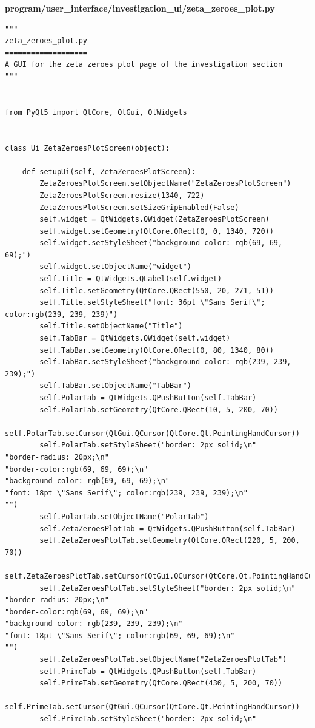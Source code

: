 \documentclass[12pt]{article}
\begin{document}
\textbf{program/user\_interface/investigation\_ui/zeta\_zeroes\_plot.py}
\begin{lstlisting}
"""
zeta_zeroes_plot.py
===================
A GUI for the zeta zeroes plot page of the investigation section
"""


from PyQt5 import QtCore, QtGui, QtWidgets


class Ui_ZetaZeroesPlotScreen(object):

    def setupUi(self, ZetaZeroesPlotScreen):
        ZetaZeroesPlotScreen.setObjectName("ZetaZeroesPlotScreen")
        ZetaZeroesPlotScreen.resize(1340, 722)
        ZetaZeroesPlotScreen.setSizeGripEnabled(False)
        self.widget = QtWidgets.QWidget(ZetaZeroesPlotScreen)
        self.widget.setGeometry(QtCore.QRect(0, 0, 1340, 720))
        self.widget.setStyleSheet("background-color: rgb(69, 69, 69);")
        self.widget.setObjectName("widget")
        self.Title = QtWidgets.QLabel(self.widget)
        self.Title.setGeometry(QtCore.QRect(550, 20, 271, 51))
        self.Title.setStyleSheet("font: 36pt \"Sans Serif\"; color:rgb(239, 239, 239)")
        self.Title.setObjectName("Title")
        self.TabBar = QtWidgets.QWidget(self.widget)
        self.TabBar.setGeometry(QtCore.QRect(0, 80, 1340, 80))
        self.TabBar.setStyleSheet("background-color: rgb(239, 239, 239);")
        self.TabBar.setObjectName("TabBar")
        self.PolarTab = QtWidgets.QPushButton(self.TabBar)
        self.PolarTab.setGeometry(QtCore.QRect(10, 5, 200, 70))
        self.PolarTab.setCursor(QtGui.QCursor(QtCore.Qt.PointingHandCursor))
        self.PolarTab.setStyleSheet("border: 2px solid;\n"
"border-radius: 20px;\n"
"border-color:rgb(69, 69, 69);\n"
"background-color: rgb(69, 69, 69);\n"
"font: 18pt \"Sans Serif\"; color:rgb(239, 239, 239);\n"
"")
        self.PolarTab.setObjectName("PolarTab")
        self.ZetaZeroesPlotTab = QtWidgets.QPushButton(self.TabBar)
        self.ZetaZeroesPlotTab.setGeometry(QtCore.QRect(220, 5, 200, 70))
        self.ZetaZeroesPlotTab.setCursor(QtGui.QCursor(QtCore.Qt.PointingHandCursor))
        self.ZetaZeroesPlotTab.setStyleSheet("border: 2px solid;\n"
"border-radius: 20px;\n"
"border-color:rgb(69, 69, 69);\n"
"background-color: rgb(239, 239, 239);\n"
"font: 18pt \"Sans Serif\"; color:rgb(69, 69, 69);\n"
"")
        self.ZetaZeroesPlotTab.setObjectName("ZetaZeroesPlotTab")
        self.PrimeTab = QtWidgets.QPushButton(self.TabBar)
        self.PrimeTab.setGeometry(QtCore.QRect(430, 5, 200, 70))
        self.PrimeTab.setCursor(QtGui.QCursor(QtCore.Qt.PointingHandCursor))
        self.PrimeTab.setStyleSheet("border: 2px solid;\n"

\end{lstlisting}
\end{document}
